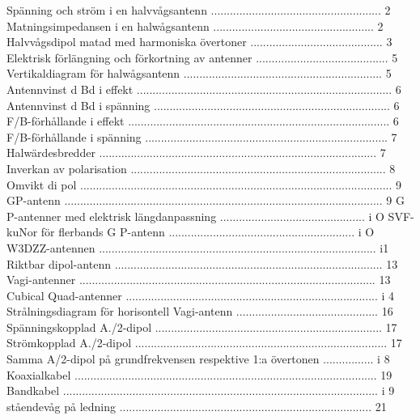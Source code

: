 \documentclass[a4paper,twoside,twocolumn,openright]{book}
\begin{document}
{{{{{{{{{{{Spänning och ström i en halvvågsantenn ...................................................... 2
Matningsimpedansen i en halwågsantenn ................................................... 2
Halvvågsdipol matad med harmoniska övertoner .......................................... 3
Elektrisk förlängning och förkortning av antenner .......................................... 5
Vertikaldiagram för halwågsantenn ............................................................... 5
Antennvinst d Bd i effekt ................................................................................. 6
Antennvinst d Bd i spänning ........................................................................... 6
F/B-förhållande i effekt ................................................................................... 6
F/B-förhållande i spänning ............................................................................. 7
Halwärdesbredder ........................................................................................ 7
Inverkan av polarisation ................................................................................. 8
Omvikt di pol ................................................................................................... 9
GP-antenn ..................................................................................................... 9
G P-antenner med elektrisk längdanpassning .............................................. i O
SVF-kuNor för flerbands G P-antenn ........................................................... i O
W3DZZ-antennen ........................................................................................ i1
Riktbar dipol-antenn ..................................................................................... 13
Vagi-antenner .............................................................................................. 13
Cubical Quad-antenner ................................................................................ i 4
Strålningsdiagram för horisontell Vagi-antenn ............................................. 16
Spänningskopplad A./2-dipol ........................................................................ 17
Strömkopplad A./2-dipol ................................................................................ 17
Samma A/2-dipol på grundfrekvensen respektive 1:a övertonen ................ i 8
Koaxialkabel ................................................................................................ 19
Bandkabel .................................................................................................... i 9
ståendevåg på ledning ................................................................................ 21
}}}}}}}}}}}
\end{document}
